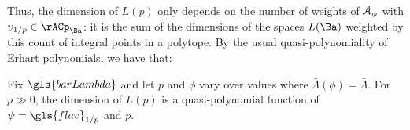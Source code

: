 Thus, the dimension of $L(p)$ only depends on the number of weights of
$\EuScript{A}_{\phi}$  with $\upsilon_{1/p}\in \rACp_{\Ba}$: it is the sum of the
dimensions of the 
spaces $L(\Ba)$ weighted by this count of integral points in a
polytope.  By the usual quasi-polynomiality of Erhart polynomials, we have that:
\begin{corollary} Fix $\gls{barLambda}$ and  let $p$ and $\phi$ vary over values where $\bar{\Lambda}(\phi)=\bar{\Lambda}$.  
  For $p\gg 0$, the dimension of $L(p)$ is a quasi-polynomial function of $\psi=\gls{flav}_{1/p}$ and
  $p$.  
\end{corollary}

